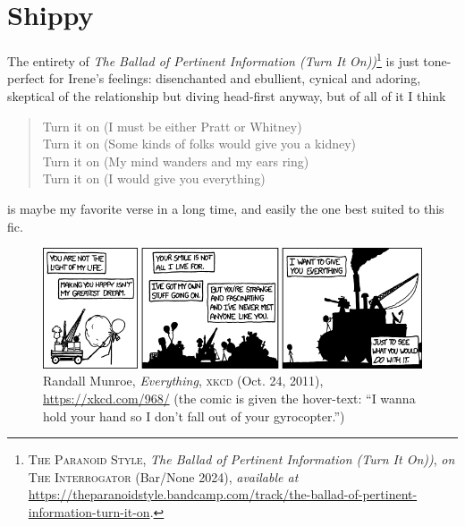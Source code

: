 \documentclass[../FGP.tex]{subfiles}
\begin{document}
\section{Shippy}
The entirety of \textit{The Ballad of Pertinent Information (Turn It On))}\footnote{\textsc{The Paranoid Style}, \textit{The Ballad of Pertinent Information (Turn It On))}, \textit{on} \textsc{The Interrogator} (Bar/None 2024), \textit{available at} \url{https://theparanoidstyle.bandcamp.com/track/the-ballad-of-pertinent-information-turn-it-on}.} is just tone-perfect for Irene's feelings: disenchanted and ebullient, cynical and adoring, skeptical of the relationship but diving head-first anyway, but of all of it I think \begin{verse}
Turn it on (I must be either Pratt or Whitney)\\
Turn it on (Some kinds of folks would give you a kidney)\\
Turn it on (My mind wanders and my ears ring)\\
Turn it on (I would give you everything)
\end{verse} is maybe my favorite verse in a long time, and easily the one best suited to this fic. 

\begin{figure}
  \includegraphics[width=\textwidth]{../lib/everything}
  \caption{Randall Munroe, \textit{Everything}, \textsc{xkcd} (Oct. 24, 2011), \url{https://xkcd.com/968/} (the comic is given the hover-text: ``I wanna hold your hand so I don't fall out of your gyrocopter.'')}
\end{figure}
\end{document}
